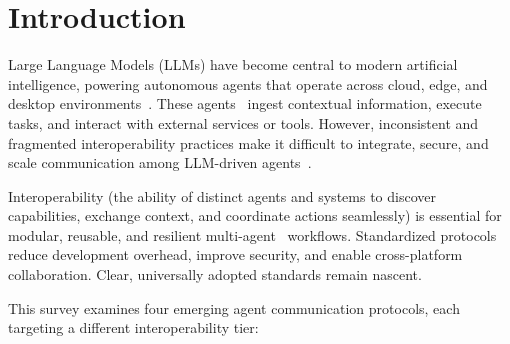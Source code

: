 \documentclass{article}
\begin{document}
\section{Introduction}


Large Language Models (LLMs) have become central to modern artificial intelligence, powering autonomous agents that operate across cloud, edge, and desktop environments~\cite{brown2020language,bommasani2021opportunities}. These agents~\cite{Wang_2024} ingest contextual information, execute tasks, and interact with external services or tools. However, inconsistent and fragmented interoperability practices make it difficult to integrate, secure, and scale communication among LLM-driven agents~\cite{mialon2023augmented}.

Interoperability (the ability of distinct agents and systems to discover capabilities, exchange context, and coordinate actions seamlessly) is essential for modular, reusable, and resilient multi-agent~\cite{guo2024largelanguagemodelbased} workflows. Standardized protocols reduce development overhead, improve security, and enable cross-platform collaboration. Clear, universally adopted standards remain nascent.

This survey examines four emerging agent communication protocols, each targeting a different interoperability tier:
\end{document}
